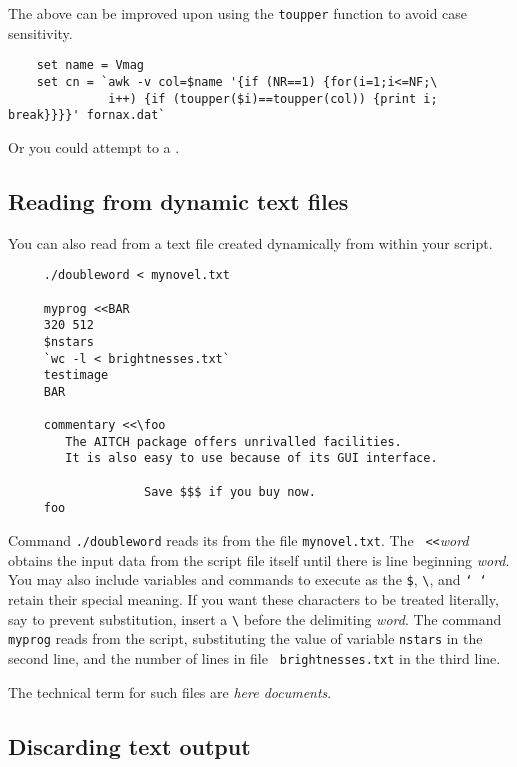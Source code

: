 The above can be improved upon using the {\tt toupper} function to avoid
case sensitivity.
\small
\begin{verbatim}
    set name = Vmag
    set cn = `awk -v col=$name '{if (NR==1) {for(i=1;i<=NF;\
              i++) {if (toupper($i)==toupper(col)) {print i; break}}}}' fornax.dat`
\end{verbatim}
\normalsize
Or you could attempt to  a
.

\subsection{Reading from dynamic text files
\label{sc4_se_reading_files}}

You can also read from a text file created dynamically from within
your script.

\small
\begin{verbatim}
     ./doubleword < mynovel.txt

     myprog <<BAR
     320 512
     $nstars
     `wc -l < brightnesses.txt`
     testimage
     BAR

     commentary <<\foo
        The AITCH package offers unrivalled facilities.
        It is also easy to use because of its GUI interface.
        
                   Save $$$ if you buy now.
     foo
\end{verbatim}
\normalsize
Command {\tt ./doubleword} reads its  from the file {\tt mynovel.txt}.  The {\tt
<<}{\em word\/} obtains the input data from the script file itself
until there is line beginning {\em word}.  You may also include
variables and commands to execute as the {\tt \$},
\verb+\+, and {\tt `~`} retain their special meaning.  If you want these
characters to be treated literally, say to prevent substitution, insert
a \verb+\+ before the delimiting {\em word}.  The command {\tt myprog}
reads from the script, substituting the value of variable {\tt nstars}
in the second line, and the number of lines in file {\tt
brightnesses.txt} in the third line.

The technical term for such files are {\em here documents}.

\subsection{Discarding text output
\label{sc4_se_junk_output}}

